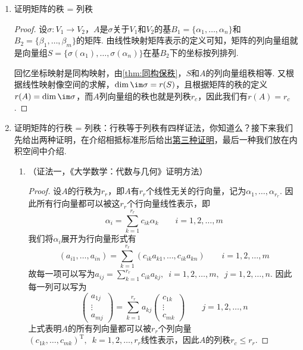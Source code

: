 \begin{enumerate}
    \item 证明矩阵的秩 = 列秩

          \begin{proof}
              设$\sigma:V_1\to V_2$，$A$是$\sigma$关于$V_1$和$V_2$的基$B_1=\{\alpha_1,\ldots,\alpha_n\}$和$B_2=\{\beta_1,\ldots,\beta_m\}$的矩阵. 由线性映射矩阵表示的定义可知，矩阵的列向量组就是向量组$S=\{\sigma(\alpha_1),\ldots,\sigma(\alpha_n)\}$在基$B_2$下的坐标按列排列.

              回忆坐标映射是同构映射，由\autoref{thm:同构保秩}，$S$和$A$的列向量组秩相等. 又根据线性映射像空间的求解，$\dim\im\sigma=r(S)$，且根据矩阵的秩的定义$r(A)=\dim\im\sigma$，而$A$列向量组的秩也就是列秩$r_c$，因此我们有$r(A)=r_c$.
          \end{proof}

    \item 证明矩阵的行秩 = 列秩：行秩等于列秩有四样证法，你知道么？接下来我们先给出两种证明，在介绍相抵标准形后给出\hyperref[pf:11:矩阵行秩=列秩]{第三种证明}，最后一种我们放在内积空间中介绍.
          \begin{enumerate}
              \item （证法一，《大学数学：代数与几何》证明方法）

                    \begin{proof}
                        设$A$的行秩为$r_r$，即$A$有$r_r$个线性无关的行向量，记为$\alpha_1,\ldots,\alpha_{r_r}$. 因此所有行向量都可以被这$r_r$个行向量线性表示，即
                        \[\alpha_i=\sum_{k=1}^{r_r}c_{ik}\alpha_k \qquad i=1,2,\ldots,m\]
                        我们将$\alpha_i$展开为行向量形式有
                        \[(a_{i1},\ldots,a_{in})=\sum_{k=1}^{r_r}(c_{ik}a_{k1},\ldots,c_{ik}a_{kn}) \qquad i=1,2,\ldots,m\]
                        故每一项可以写为$a_{ij}=\displaystyle\sum_{k=1}^{r_r}c_{ik}a_{kj},\enspace i=1,2,\ldots,m,\enspace j=1,2,\ldots,n$. 因此每一列可以写为
                        \[\begin{pmatrix}
                                a_{1j} \\ \vdots \\ a_{mj}
                            \end{pmatrix}=\sum_{k=1}^{r_r}a_{kj}\begin{pmatrix}
                                c_{1k} \\ \vdots \\ c_{mk}
                            \end{pmatrix} \qquad j=1,2,\ldots,n\]
                        上式表明$A$的所有列向量都可以被$r_r$个列向量$(c_{1k},\ldots,c_{mk})^\mathrm{T},\enspace k=1,2,\ldots,r_r$线性表示，因此$A$的列秩$r_c\leqslant r_r$.


\end{proof}
\end{enumerate}
\end{enumerate}
